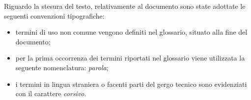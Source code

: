 Riguardo la stesura del testo, relativamente al documento sono state adottate le seguenti convenzioni tipografiche:
\begin{itemize}
	\item termini di uso non comune vengono definiti nel glossario, situato alla fine del documento;
	\item per la prima occorrenza dei termini riportati nel glossario viene utilizzata la seguente nomenclatura: \emph{parola}\glsfirstoccur;
	\item i termini in lingua straniera o facenti parti del gergo tecnico sono evidenziati con il carattere \emph{corsivo}.
\end{itemize}